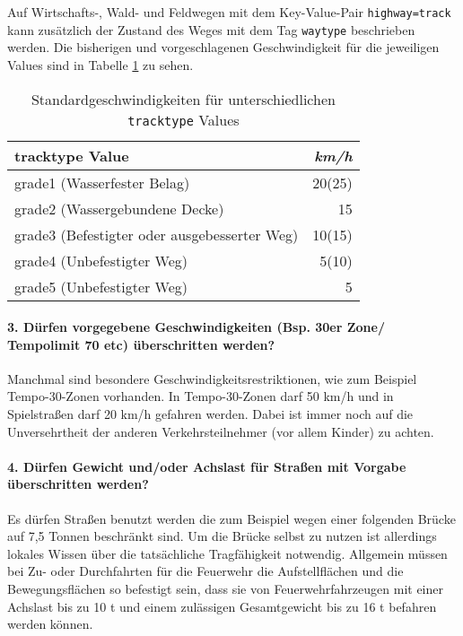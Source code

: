 Auf Wirtschafts-, Wald- und Feldwegen mit dem Key-Value-Pair \texttt{highway=track} kann zusätzlich der Zustand des Weges mit dem Tag \texttt{waytype} beschrieben werden.
Die bisherigen und vorgeschlagenen Geschwindigkeit für die jeweiligen Values sind in Tabelle \ref{tab:speedinfotrack} zu sehen.

\begin{table}[h]
\centering
\caption{Standardgeschwindigkeiten für unterschiedlichen \texttt{tracktype} Values}
\label{tab:speedinfotrack}
\begin{tabular}{|l|r|}
\hline
tracktype Value & \textit{km/h} \\
\hline
grade1 (Wasserfester Belag) & 20(25)   \\
grade2 (Wassergebundene Decke) & 15  \\
grade3 (Befestigter oder ausgebesserter Weg) & 10(15)  \\
grade4 (Unbefestigter Weg) & 5(10)   \\
grade5 (Unbefestigter Weg) & 5   \\
\hline
\end{tabular}
\end{table}

\paragraph*{3. Dürfen vorgegebene Geschwindigkeiten (Bsp. 30er Zone/ Tempolimit 70 etc) überschritten werden?}
\label{frage3}
Manchmal sind besondere Geschwindigkeitsrestriktionen, wie zum Beispiel Tempo-30-Zonen vorhanden.
In Tempo-30-Zonen darf 50 km/h und in Spielstraßen darf 20 km/h gefahren werden.
Dabei ist immer noch auf die Unversehrtheit der anderen Verkehrsteilnehmer (vor allem Kinder) zu achten.

\paragraph*{4. Dürfen Gewicht und/oder Achslast für Straßen mit Vorgabe überschritten werden?}
\label{frage4}

Es dürfen Straßen benutzt werden die zum Beispiel wegen einer folgenden Brücke auf 7,5 Tonnen beschränkt sind.
Um die Brücke selbst zu nutzen ist allerdings lokales Wissen über die tatsächliche Tragfähigkeit notwendig.
Allgemein müssen bei Zu- oder Durchfahrten für die Feuerwehr die Aufstellflächen und die Bewegungsflächen so befestigt sein, dass sie von Feuerwehrfahrzeugen mit einer Achslast bis zu 10 t und einem zulässigen Gesamtgewicht bis zu 16 t befahren werden können.

